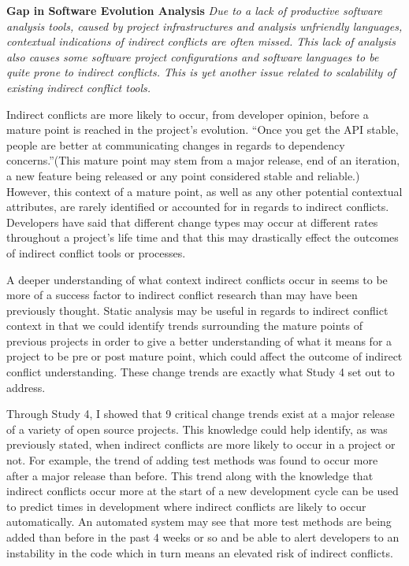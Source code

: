 \textbf{Gap in Software Evolution Analysis} \textit{Due to a lack of productive software analysis tools, caused by project infrastructures
and analysis unfriendly languages, contextual indications of indirect conflicts are often missed. This lack of analysis also causes
some software project configurations and software languages to be quite prone to indirect conflicts. This is yet another issue related
to scalability of existing indirect conflict tools.}

Indirect conflicts are more likely to occur,
from developer opinion, before a mature point is reached in the project's evolution. ``Once you get the API stable, people are 
better at communicating changes in regards to dependency concerns.''(This mature point may stem from a major release,
end of an iteration, a new feature being released or any point considered stable and reliable.) However, this context of a 
mature point, as well as any other
potential contextual attributes, are rarely identified or accounted for in regards to indirect conflicts. Developers have said
that different change types may occur at different rates throughout a project's life time and that this
may drastically effect the outcomes of indirect conflict tools or processes.

A deeper understanding of what context indirect conflicts occur in seems to be more of a success factor to indirect conflict
research than may have been previously thought. Static analysis may be useful in regards to indirect conflict context in that we
could identify trends surrounding the mature points of previous projects in order to give a better understanding of what it
means for a project to be pre or post mature point, which could affect the outcome of indirect conflict understanding.
These change trends are exactly what Study 4 set out to address.

Through Study 4, I showed that 9 critical change trends exist at a major release of a variety of open source projects. This
knowledge could help identify, as was previously stated, when indirect conflicts are more likely to occur in a project or not.
For example, the trend of adding test methods was found to occur more after a major release than before. This trend along with
the knowledge that indirect conflicts occur more at the start of a new development cycle can be used to predict times in development
where indirect conflicts are likely to occur automatically. An automated system may see that more test methods are being added than
before in the past 4 weeks or so and be able to alert developers to an instability in the code which in turn means an elevated
risk of indirect conflicts.

